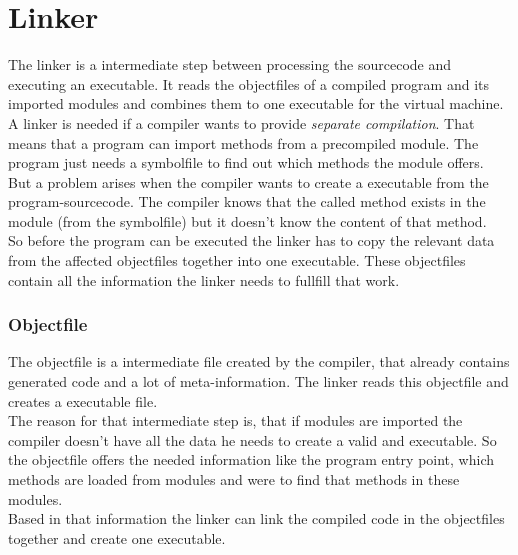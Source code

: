 \part{Linker}
The linker is a intermediate step between processing the sourcecode and
executing an executable. It reads the objectfiles of a compiled program and its imported
modules and combines them to one executable for the virtual machine.
\\
A linker is needed if a compiler wants to provide \emph{separate compilation}.
That means that a program can import methods from a precompiled module. The
program just needs a symbolfile to find out which methods the module offers. \\
But a problem arises when the compiler wants to create a executable from the
program-sourcecode. The compiler knows that the called method exists in the
module (from the symbolfile) but it doesn't know the content of that method. \\
So before the program can be executed the linker has to copy the relevant data
from the affected objectfiles together into one executable. These objectfiles contain
all the information the linker needs to fullfill that work.    

\section{Objectfile}
\label{objectfile}
The objectfile is a intermediate file created by the compiler, that already
contains generated code and a lot of meta-information. The linker reads this
objectfile and creates a executable file. \\
The reason for that intermediate step is, that if modules are imported the
compiler doesn't have all the data he needs to create a valid and executable. 
So the objectfile offers the needed information like the program entry point, which
methods are loaded from modules and were to find that methods in these modules. \\
Based in that information the linker can link the compiled code in the
objectfiles together and create one executable.

